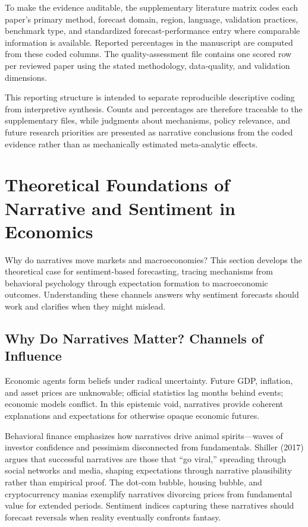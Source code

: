 \documentclass[11pt,twocolumn]{article}
\begin{document}
To make the evidence auditable, the supplementary literature matrix codes each paper's primary method, forecast domain, region, language, validation practices, benchmark type, and standardized forecast-performance entry where comparable information is available. Reported percentages in the manuscript are computed from these coded columns. The quality-assessment file contains one scored row per reviewed paper using the stated methodology, data-quality, and validation dimensions.

This reporting structure is intended to separate reproducible descriptive coding from interpretive synthesis. Counts and percentages are therefore traceable to the supplementary files, while judgments about mechanisms, policy relevance, and future research priorities are presented as narrative conclusions from the coded evidence rather than as mechanically estimated meta-analytic effects.

\section{Theoretical Foundations of Narrative and Sentiment in Economics}

Why do narratives move markets and macroeconomies? This section develops the theoretical case for sentiment-based forecasting, tracing mechanisms from behavioral psychology through expectation formation to macroeconomic outcomes. Understanding these channels answers why sentiment forecasts should work and clarifies when they might mislead.

\subsection{Why Do Narratives Matter? Channels of Influence}

Economic agents form beliefs under radical uncertainty. Future GDP, inflation, and asset prices are unknowable; official statistics lag months behind events; economic models conflict. In this epistemic void, narratives provide coherent explanations and expectations for otherwise opaque economic futures.

Behavioral finance emphasizes how narratives drive animal spirits---waves of investor confidence and pessimism disconnected from fundamentals. Shiller (2017) argues that successful narratives are those that ``go viral,'' spreading through social networks and media, shaping expectations through narrative plausibility rather than empirical proof. The dot-com bubble, housing bubble, and cryptocurrency manias exemplify narratives divorcing prices from fundamental value for extended periods. Sentiment indices capturing these narratives should forecast reversals when reality eventually confronts fantasy.
\end{document}
